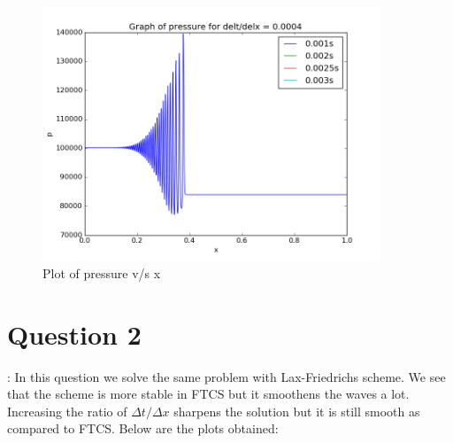 \documentclass[11pt, a4paper]{article}
\begin{document}
\begin{figure}[H]
 \centering
 \includegraphics[width = 0.9\textwidth]{FTCS2_3_7.png}
 \caption{Plot of pressure v/s x}
\end{figure}

\section{Question 2}:
In this question we solve the same problem with Lax-Friedrichs scheme. We see that the scheme is more stable in FTCS but
it smoothens the waves a lot. Increasing the ratio of $\Delta t/\Delta x$ sharpens the solution but it is still
smooth as compared to FTCS. Below are the plots obtained:
\end{document}
